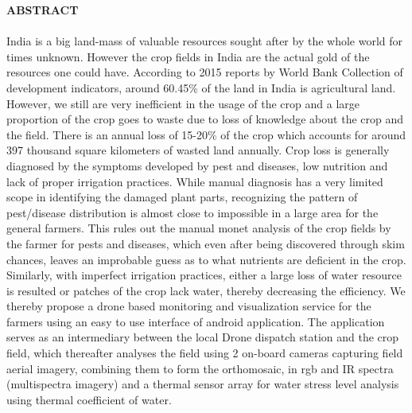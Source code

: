 \begin{center}
\thispagestyle{empty}
\vspace{2cm}
\LARGE{\textbf{ABSTRACT}}\\[1.0cm]
\end{center}
\thispagestyle{empty}
\large{\paragraph{}
India is a big land-mass of valuable resources sought after by the whole world for times unknown. However the crop fields in India are the actual gold of the resources one could have. According to 2015 reports by World Bank Collection of development indicators, around 60.45\% of the land in India is agricultural land. However, we still are very inefficient in the usage of the crop and a large proportion of the crop goes to waste due to loss of knowledge about the crop and the field. There is an annual loss of 15-20\% of the crop which accounts for around 397 thousand square kilometers of wasted land annually. Crop loss is generally diagnosed by the symptoms developed by pest and diseases, low nutrition and lack of proper irrigation practices. While manual diagnosis has a very limited scope in identifying the damaged plant parts, recognizing the pattern of pest/disease distribution is almost close to impossible in a large area for the general farmers. This rules out the manual monet analysis of the crop fields by the farmer for pests and diseases, which even after being discovered through skim chances, leaves an improbable guess as to what nutrients are deficient in the crop. Similarly, with imperfect irrigation practices, either a large loss of water resource is resulted or patches of the crop lack water, thereby decreasing the efficiency. 
We thereby propose a drone based monitoring and visualization service for the farmers using an easy to use interface of android application. The application serves as an intermediary between the local Drone dispatch station and the crop field, which thereafter analyses the field using 2 on-board cameras capturing field aerial imagery, combining them to form the orthomosaic, in rgb and IR spectra (multispectra imagery) and a thermal sensor array for water stress level analysis using thermal coefficient of water.
%
}
